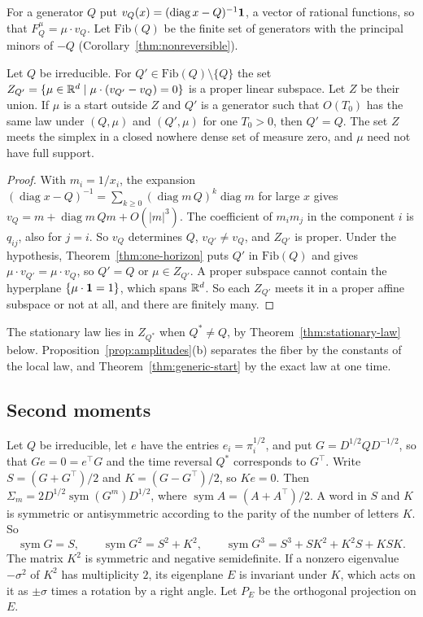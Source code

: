 For a generator $Q$ put $v_Q(x)=(\operatorname{diag}x-Q)^{-1}\mathbf{1}$, a vector of rational
functions, so that $F^\mu_Q=\mu\cdot v_Q$. Let $\mathrm{Fib}(Q)$ be the finite set of generators with
the principal minors of $-Q$ (Corollary~\ref{thm:nonreversible}).

\begin{theorem}\label{thm:generic-start}
Let $Q$ be irreducible. For $Q'\in\mathrm{Fib}(Q)\setminus\{Q\}$ the set
$Z_{Q'}=\{\mu\in\mathbb{R}^d\mid\mu\cdot(v_{Q'}-v_Q)=0\}$ is a proper linear subspace. Let $Z$ be their
union. If $\mu$ is a start outside $Z$ and $Q'$ is a generator such that $O(T_0)$ has the same law
under $(Q,\mu)$ and $(Q',\mu)$ for one $T_0>0$, then $Q'=Q$. The set $Z$ meets the simplex in a
closed nowhere dense set of measure zero, and $\mu$ need not have full support.
\end{theorem}

\begin{proof}
With $m_i=1/x_i$, the expansion $(\operatorname{diag}x-Q)^{-1}=\sum_{k\ge0}(\operatorname{diag}m\,Q)^k\operatorname{diag}m$
for large $x$ gives $v_Q=m+\operatorname{diag}m\,Qm+O(|m|^3)$. The coefficient of $m_im_j$ in the
component $i$ is $q_{ij}$, also for $j=i$. So $v_Q$ determines $Q$, $v_{Q'}\ne v_Q$, and $Z_{Q'}$ is
proper. Under the hypothesis, Theorem~\ref{thm:one-horizon} puts $Q'$ in $\mathrm{Fib}(Q)$ and
gives $\mu\cdot v_{Q'}=\mu\cdot v_Q$, so $Q'=Q$ or $\mu\in Z_{Q'}$. A proper subspace cannot
contain the hyperplane $\{\mu\cdot\mathbf{1}=1\}$, which spans $\mathbb{R}^d$. So each $Z_{Q'}$ meets it in a
proper affine subspace or not at all, and there are finitely many.
\end{proof}

The stationary law lies in $Z_{Q^*}$ when $Q^*\ne Q$, by Theorem~\ref{thm:stationary-law} below.
Proposition~\ref{prop:amplitudes}(b) separates the fiber by the constants of the local law, and
Theorem~\ref{thm:generic-start} by the exact law at one time.

\subsection{Second moments}\label{sec:law-moments}

Let $Q$ be irreducible, let $e$ have the entries $e_i=\pi_i^{1/2}$, and put $G=D^{1/2}QD^{-1/2}$, so that $Ge=0=e^\top G$ and
the time reversal $Q^*$ corresponds to $G^\top$. Write $S=(G+G^\top)/2$ and $K=(G-G^\top)/2$,
so $Ke=0$. Then $\Sigma_m=2D^{1/2}\operatorname{sym}(G^m)D^{1/2}$, where
$\operatorname{sym}A=(A+A^\top)/2$. A word in $S$ and $K$ is symmetric or antisymmetric according
to the parity of the number of letters $K$. So
\begin{equation}\label{eq:sym-powers}
 \operatorname{sym}G=S,\qquad\operatorname{sym}G^2=S^2+K^2,\qquad
 \operatorname{sym}G^3=S^3+SK^2+K^2S+KSK .
\end{equation}
The matrix $K^2$ is symmetric and negative semidefinite. If a nonzero eigenvalue $-\sigma^2$ of
$K^2$ has multiplicity $2$, its eigenplane $E$ is invariant under $K$, which acts on it as $\pm\sigma$
times a rotation by a right angle. Let $P_E$ be the orthogonal projection on $E$.

